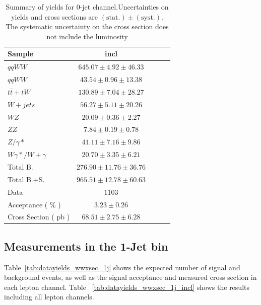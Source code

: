 \begin{table}[!ht]
{\small
\begin{center}
\begin{tabular}{|l|c|c|c|c|}
\hline
Sample  & incl  \\ \hline
$qqWW$  & $645.07 \pm 4.92 \pm 46.33 $  \\
$qqWW$  & $43.54 \pm 0.96 \pm 13.38 $   \\
$t\bar{t} + tW$ & $130.89 \pm 7.04 \pm 28.27 $  \\
$W+jets$    & $56.27 \pm 5.11 \pm 20.26 $   \\
$WZ$    & $20.09 \pm 0.36 \pm 2.27 $    \\
$ZZ$    & $7.84 \pm 0.19 \pm 0.78 $ \\
$Z/\gamma*$ & $41.11 \pm 7.16 \pm 9.86 $    \\
$W\gamma*/W+\gamma$ & $20.70 \pm 3.35 \pm 6.21 $    \\
\hline \hline
Total B.    & $276.90 \pm 11.76 \pm 36.76 $ \\ \hline \hline
Total B.+S. & $965.51 \pm 12.78 \pm 60.63 $ \\ \hline \hline
Data    & $1103$    \\ \hline \hline
Acceptance ( \% )   & $3.23 \pm 0.26    $\\
Cross Section ( pb )    & $68.51 \pm 2.75 \pm 6.28$     \\ \hline
\end{tabular}
\caption{Summary of yields for 0-jet channel.Uncertainties on yields and cross sections are $\mathrm{(stat.)} \pm \mathrm{(syst.)}$. The systematic uncertainty on the cross section does not include the luminosity}
\label{tab:datayields_wwxsec_0j_incl}
\end{center}}
\end{table}

\clearpage
\subsection{Measurements in the 1-Jet bin}

Table~\ref{tab:datayields_wwxsec_1j} shows the expected number of signal and background events,
as well as the signal acceptance and measured cross section in each lepton channel.
Table ~\ref{tab:datayields_wwxsec_1j_incl} shows the results including all lepton channels.


